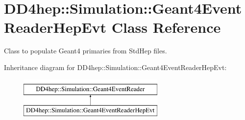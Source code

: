 \hypertarget{class_d_d4hep_1_1_simulation_1_1_geant4_event_reader_hep_evt}{}\section{D\+D4hep\+:\+:Simulation\+:\+:Geant4\+Event\+Reader\+Hep\+Evt Class Reference}
\label{class_d_d4hep_1_1_simulation_1_1_geant4_event_reader_hep_evt}


Class to populate Geant4 primaries from Std\+Hep files.  


Inheritance diagram for D\+D4hep\+:\+:Simulation\+:\+:Geant4\+Event\+Reader\+Hep\+Evt\+:\begin{figure}[H]
\begin{center}
\leavevmode
\includegraphics[height=2.000000cm]{class_d_d4hep_1_1_simulation_1_1_geant4_event_reader_hep_evt}
\end{center}
\end{figure}

